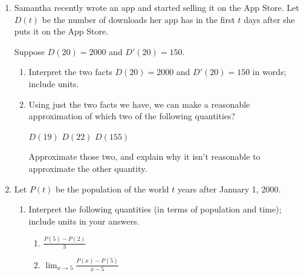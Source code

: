 \documentclass{article}
\begin{document}
\begin{enumerate}
  \pspace{0.75in}

\item  Samantha recently wrote an app and started selling it on the App Store. Let $D(t)$ be the number of downloads her app has in the first $t$ days after she puts it on the App Store.

  Suppose $D(20) = 2000$ and $D'(20) = 150$.
  \begin{enumerate}
  \item
    \begin{problem}[\vfill]
      Interpret the two facts $D(20) = 2000$ and $D'(20) = 150$ in words; include units.
    \end{problem}

  \item
    \begin{problem}[\vfill\newpage]
      Using just the two facts we have, we can make a reasonable approximation of which two of the following quantities? 
      \begin{center}
        $D(19)$ \hspace{1in} $D(22)$ \hspace{1in} $D(155)$
      \end{center}
      Approximate those two, and explain why it isn't reasonable to approximate the other quantity. 
    \end{problem}

  \end{enumerate}

\item  \label{workshop-interpret-and-visualize-derivative} Let $P(t)$ be the population of the world $t$ years after January 1, 2000.

  \begin{enumerate}
  \item \label{workshop-interpret-and-visualize-derivative-interpret}

    Interpret the following quantities (in terms of population and time); include units in your answers.
    \begin{enumerate}
    \item
      \begin{problem}[\vfill]
        $\displaystyle \frac{P(5) - P(2)}{3}$
      \end{problem}

    \item
      \begin{problem}[\vfill]
        $\displaystyle \lim_{x \rightarrow 5} \frac{P(x) -P(5)}{x-5}$
      \end{problem}


\end{enumerate}
\end{enumerate}
\end{enumerate}
\end{document}
